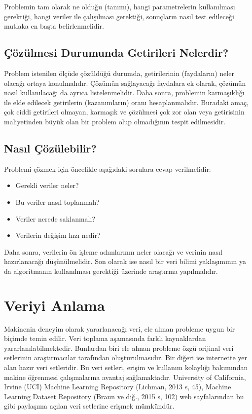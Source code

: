 \documentclass[12pt,twoside]{deuthesis}
\providecommand{\tightlist}{%
  \setlength{\itemsep}{0pt}\setlength{\parskip}{0pt}}
\begin{document}
Problemin tam olarak ne olduğu (tanımı), hangi parametrelerin kullanılması gerektiği, hangi veriler ile çalışılması gerektiği, sonuçların nasıl test edileceği mutlaka en başta belirlenmelidir.

\hypertarget{uxe7uxf6zuxfclmesi-durumunda-getirileri-nelerdir}{%
\subsection{Çözülmesi Durumunda Getirileri Nelerdir?}\label{uxe7uxf6zuxfclmesi-durumunda-getirileri-nelerdir}}

Problem istenilen ölçüde çözüldüğü durumda, getirilerinin (faydaların) neler olacağı ortaya konulmalıdır. Çözümün sağlayacağı faydalara ek olarak, çözümün nasıl kullanılacağı da ayrıca listelenmelidir. Daha sonra, problemin karmaşıklığı ile elde edilecek getirilerin (kazanımların) oranı hesaplanmalıdır. Buradaki amaç, çok ciddi getirileri olmayan, karmaşık ve çözülmesi çok zor olan veya getirisinin maliyetinden büyük olan bir problem olup olmadığının tespit edilmesidir.

\hypertarget{nasux131l-uxe7uxf6zuxfclebilir}{%
\subsection{Nasıl Çözülebilir?}\label{nasux131l-uxe7uxf6zuxfclebilir}}

Problemi çözmek için öncelikle aşağıdaki sorulara cevap verilmelidir:
\begin{itemize}
\tightlist
\item
  Gerekli veriler neler?
\item
  Bu veriler nasıl toplanmalı?
\item
  Veriler nerede saklanmalı?
\item
  Verilerin değişim hızı nedir?
\end{itemize}
Daha sonra, verilerin ön işleme adımlarının neler olacağı ve verinin nasıl hazırlanacağı düşünülmelidir. Son olarak ise nasıl bir veri bilimi yaklaşımının ya da algoritmanın kullanılması gerektiği üzerinde araştırma yapılmalıdır.

\hypertarget{veriyi-anlama}{%
\section{Veriyi Anlama}\label{veriyi-anlama}}

Makinenin deneyim olarak yararlanacağı veri, ele alınan probleme uygun bir biçimde temin edilir. Veri toplama aşamasında farklı kaynaklardan yararlanılabilmektedir. Bunlardan biri ele alınan probleme özgü orijinal veri setlerinin araştırmacılar tarafından oluşturulmasıdır. Bir diğeri ise internette yer alan hazır veri setleridir. Bu veri setleri, erişim ve kullanım kolaylığı bakımından makine öğrenmesi çalışmalarına avantaj sağlamaktadır. University of California, Irvine (UCI) Machine Learning Repository (Lichman, 2013 s, 45), Machine Learning Dataset Repository (Braun ve diğ., 2015 s, 102) web sayfalarından bu gibi paylaşıma açılan veri setlerine erişmek mümkündür.
\end{document}

